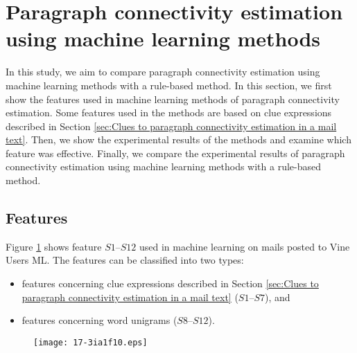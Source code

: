 \documentclass[english]{jnlp_1.4}
\begin{document}
\section{Paragraph connectivity estimation using machine learning methods}
\label{sec:Paragraph connectivity estimation using machine learning methods}

In this study, 
we aim to compare paragraph connectivity estimation 
using machine learning methods 
with a rule-based method.
In this section, 
we first show the features used in 
machine learning methods of paragraph connectivity estimation.
Some features used in the methods are based on clue expressions described 
in Section \ref{sec:Clues to paragraph connectivity estimation in a mail text}.
Then, 
we show the experimental results of the methods and 
examine which feature was effective.
Finally, 
we compare the experimental results of 
paragraph connectivity estimation 
using machine learning methods 
with a rule-based method.




\subsection{Features}
\label{subsec:Features}

Figure 
\ref{fig:Features used in machine learning methods of paragraph connectivity estimation} shows 
feature $S1$--$S12$
used in machine learning 
on mails posted to Vine Users ML.
The features can be classified into two types:
\pagebreak
\begin{itemize}
 \item features concerning clue expressions described in Section 
       \ref{sec:Clues to paragraph connectivity estimation in a mail text} ($S1$--$S7$), 
       and
 \item features concerning word unigrams ($S8$--$S12$).
\end{itemize}


\begin{figure}[t]
\begin{center}
\texttt{[image: 17-3ia1f10.eps]}
\end{center}
 \label{fig:Features used in machine learning methods of paragraph connectivity estimation}
\end{figure}
\end{document}

